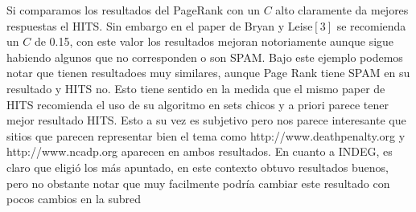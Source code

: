 Si comparamos los resultados del PageRank con un $C$ alto claramente da mejores respuestas el HITS. Sin embargo en el paper de Bryan y Leise$[3]$ se recomienda un $C$ de 0.15, con este valor los resultados mejoran notoriamente aunque sigue habiendo algunos que no corresponden o son SPAM. 
Bajo este ejemplo podemos notar que tienen resultadoes muy similares, aunque Page Rank tiene SPAM en su resultado y HITS no. Esto tiene sentido en la medida que el mismo paper de HITS recomienda el uso de su algoritmo en sets chicos y a priori parece tener mejor resultado HITS. Esto a su vez es subjetivo pero nos parece interesante que sitios que parecen representar bien el tema como http://www.deathpenalty.org y http://www.ncadp.org aparecen en ambos resultados.
En cuanto a INDEG, es claro que eligió los más apuntado, en este contexto obtuvo resultados buenos, pero no obstante notar que muy facilmente podría cambiar este resultado con pocos cambios en la subred
